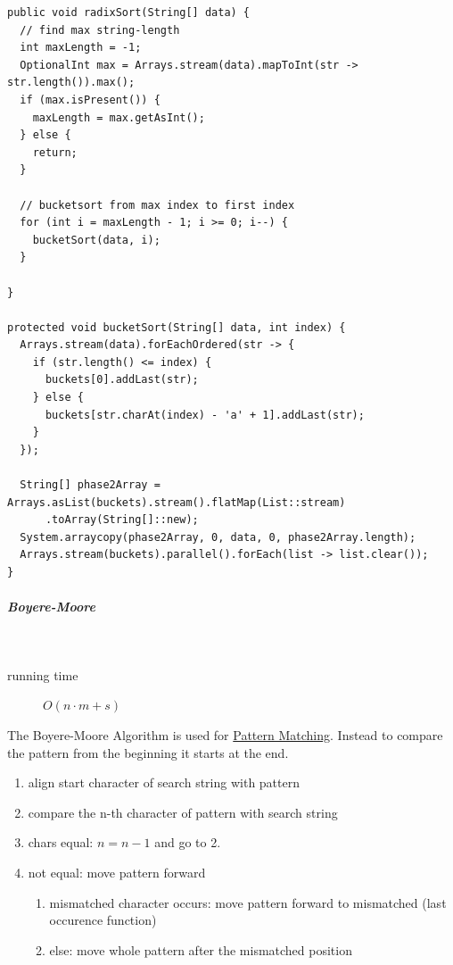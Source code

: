 \documentclass[11pt,twoside,twocolumn,landscape]{article}
\begin{document}
\lstset{language=java,label= ,caption= ,captionpos=b,numbers=none}
\begin{lstlisting}
public void radixSort(String[] data) {
  // find max string-length
  int maxLength = -1;
  OptionalInt max = Arrays.stream(data).mapToInt(str -> str.length()).max();
  if (max.isPresent()) {
    maxLength = max.getAsInt();
  } else {
    return;
  }

  // bucketsort from max index to first index
  for (int i = maxLength - 1; i >= 0; i--) {
    bucketSort(data, i);
  }

}

protected void bucketSort(String[] data, int index) {
  Arrays.stream(data).forEachOrdered(str -> {
    if (str.length() <= index) {
      buckets[0].addLast(str);
    } else {
      buckets[str.charAt(index) - 'a' + 1].addLast(str);
    }
  });

  String[] phase2Array = Arrays.asList(buckets).stream().flatMap(List::stream)
      .toArray(String[]::new);
  System.arraycopy(phase2Array, 0, data, 0, phase2Array.length);
  Arrays.stream(buckets).parallel().forEach(list -> list.clear());
}
\end{lstlisting}

\subparagraph{Boyere-Moore} \
\label{sec:org25d64b0}

\begin{description}
\item[{running time}] \(O(n\cdot m + s)\)
\end{description}

The Boyere-Moore Algorithm is used for \href{../../../roam/20211215163350-pattern_matching.org}{Pattern Matching}.
Instead to compare the pattern from the beginning it starts at the end.

\begin{enumerate}
\item align start character of search string with pattern
\item compare the n-th character of pattern with search string
\item chars equal: \(n = n-1\) and go to 2.
\item not equal: move pattern forward
\begin{enumerate}
\item mismatched character occurs: move pattern forward to mismatched (last occurence function)
\item else: move whole pattern after the mismatched position
\end{enumerate}
\end{enumerate}
\end{document}
